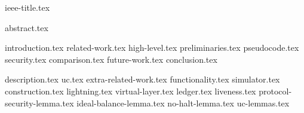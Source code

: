 \documentclass[conference,compsoc]{IEEEtran}
\begin{document}
{ieee-title.tex}
\maketitle
{abstract.tex}

{introduction.tex}
{related-work.tex}
{high-level.tex}
{preliminaries.tex}
{pseudocode.tex}
{security.tex}
{comparison.tex}
{future-work.tex}
{conclusion.tex}

\makeatletter%
%
  {\appendices}%
  {\appendix}%
\makeatother%
{description.tex}
{uc.tex}
{extra-related-work.tex}
{functionality.tex}
{simulator.tex}
{construction.tex}
{lightning.tex}
{virtual-layer.tex}
{ledger.tex}
{liveness.tex}
{protocol-security-lemma.tex}
{ideal-balance-lemma.tex}
{no-halt-lemma.tex}
{uc-lemmas.tex}
\end{document}
